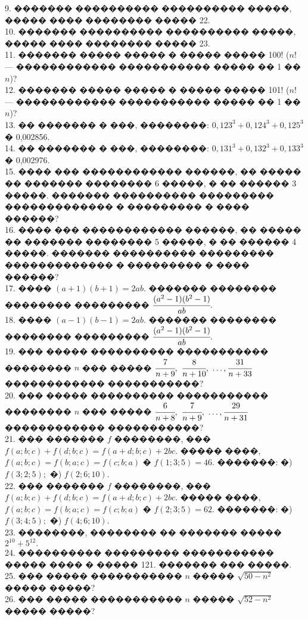 \documentclass[12pt]{article}
\begin{document}
9. ������� ���������� ���������� �����, ����� ���� �������� ����� 22.\\
10. ������� ���������� ���������� �����, ����� ���� �������� ����� 23.\\
11. ������� ����� ����� � ����� ����� 100! ($n!$ --- ������������ ����������� ����� �� 1 �� $n$)?\\
12. ������� ����� ����� � ����� ����� 101! ($n!$ --- ������������ ����������� ����� �� 1 �� $n$)?\\
13. �� ������� � ���, ��������: $0,123^3+0,124^3+0,125^3$ � 0,002856.\\
14. �� ������� � ���, ��������: $0,131^3+0,132^3+0,133^3$ � 0,002976.\\
15. ���� ��� ������������ ������, �� ����� �� ������� �������� 6 �����, � �� ������ 3 �����. ������� ���������� ��������� ������������� � ��������� � ���� ������?\\
16. ���� ��� ������������ ������, �� ����� �� ������� �������� 5 �����, � �� ������ 4 �����. ������� ���������� ��������� ������������� � ��������� � ���� ������?\\
17. ���� $(a+1)(b+1)=2ab.$ ������� �������� �������� ��������� $\cfrac{(a^2-1)(b^2-1)}{ab}.$\\
18. ���� $(a-1)(b-1)=2ab.$ ������� �������� �������� ��������� $\cfrac{(a^2-1)(b^2-1)}{ab}.$\\
19. ��� ����� ���������� ����������� �������� $n$ ��� ����� $\cfrac{7}{n+9},\ \cfrac{8}{n+10},\ \ldots, \cfrac{31}{n+33}$ ������������ �����������?\\
20. ��� ����� ���������� ����������� �������� $n$ ��� ����� $\cfrac{6}{n+8},\ \cfrac{7}{n+9},\ \ldots, \cfrac{29}{n+31}$ ������������ �����������?\\
21. ��� ������� $f$ ��������, ��� $f(a;b;c)+f(d;b;c)=f(a+d;b;c)+2bc.$ ����� ����, $f(a;b;c)=f(b;a;c)=f(c;b;a)$ � $f(1;3;5)=46.$ �������: �) $f(3;2;5);$
�) $f(2;6;10).$\\
22. ��� ������� $f$ ��������, ��� $f(a;b;c)+f(d;b;c)=f(a+d;b;c)+2bc.$ ����� ����, $f(a;b;c)=f(b;a;c)=f(c;b;a)$ � $f(2;3;5)=62.$ �������: �) $f(3;4;5);$
�) $f(4;6;10).$\\
23. ��������, �������� �� ������� ����� $2^{10}+5^{12}.$\\
24. ���������� ��������� ����������� ����� ���� � ����� 121. ������� ��� �����.\\
25. ��� ����� ����������� $n$ ����� $\sqrt{50-n^2}$ ����� �����?\\
26. ��� ����� ����������� $n$ ����� $\sqrt{52-n^2}$ ����� �����?\\
\end{document}
